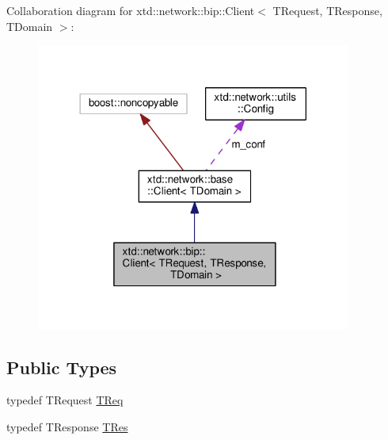 Collaboration diagram for xtd\+:\+:network\+:\+:bip\+:\+:Client$<$ T\+Request, T\+Response, T\+Domain $>$\+:
\nopagebreak
\begin{figure}[H]
\begin{center}
\leavevmode
\includegraphics[width=294pt]{classxtd_1_1network_1_1bip_1_1Client__coll__graph}
\end{center}
\end{figure}
\subsection*{Public Types}
\begin{DoxyCompactItemize}
\item 
typedef T\+Request \hyperlink{classxtd_1_1network_1_1bip_1_1Client_a4fd207d42e4738c5aa2f6ca947067be4}{T\+Req}
\item 
typedef T\+Response \hyperlink{classxtd_1_1network_1_1bip_1_1Client_a1fc57254a811008a795987c49c222e77}{T\+Res}
\end{DoxyCompactItemize}
